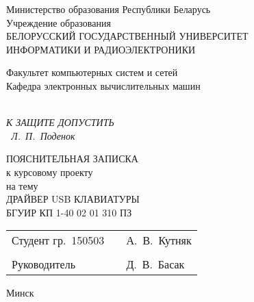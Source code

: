 \thispagestyle{empty}

\begin{center}
  Министерство образования Республики Беларусь\\[1em]
  Учреждение образования\\
  БЕЛОРУССКИЙ ГОСУДАРСТВЕННЫЙ УНИВЕРСИТЕТ\\
  ИНФОРМАТИКИ И РАДИОЭЛЕКТРОНИКИ\\[2em]

  \begin{minipage}{\textwidth}
    \begin{flushleft}
      Факультет компьютерных систем и сетей\\[1em]
      Кафедра электронных вычислительных машин\\[1em]
    \end{flushleft}
  \end{minipage}\\[1em]

  \vspace{3em}
  \hfill 
  \textit{\MakeUppercase{К защите допустить}}\\
  \vspace{0.6em}
  \hfill 
  \underline{\hspace{2.7cm}}\textit{~Л.~П.~Поденок} %

  \vfill
    ПОЯСНИТЕЛЬНАЯ ЗАПИСКА \\
    к курсовому проекту \\
    на тему \\
    \MakeUppercase{Драйвер USB клавиатуры} \\ 
    БГУИР КП 1-40 02 01 310 ПЗ \\

  \vfill

  \begin{tabular}{p{}p{}p{}}
    Студент гр.~150503     &&   А.~В.~Кутняк  \\
                           &&                 \\
    Руководитель           &&   Д.~В.~Басак   \\
  \end{tabular}
  
  \vfill

  {\normalsize Минск \the\year}
\end{center}

\pagebreak %